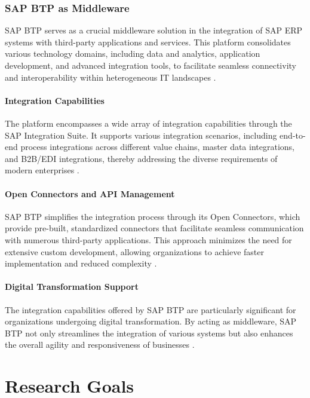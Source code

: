 \subsubsection{SAP BTP as Middleware}

SAP BTP serves as a crucial middleware solution in the integration of SAP ERP systems with third-party applications and services. This platform consolidates various technology domains, including data and analytics, application development, and advanced integration tools, to facilitate seamless connectivity and interoperability within heterogeneous IT landscapes \cite{sap_press, sap_community}.

\paragraph{Integration Capabilities}

The platform encompasses a wide array of integration capabilities through the SAP Integration Suite. It supports various integration scenarios, including end-to-end process integrations across different value chains, master data integrations, and B2B/EDI integrations, thereby addressing the diverse requirements of modern enterprises \cite{sap_learning, sap_community}. 

\paragraph{Open Connectors and API Management}

SAP BTP simplifies the integration process through its Open Connectors, which provide pre-built, standardized connectors that facilitate seamless communication with numerous third-party applications. This approach minimizes the need for extensive custom development, allowing organizations to achieve faster implementation and reduced complexity \cite{sap_community}. 

\paragraph{Digital Transformation Support}

The integration capabilities offered by SAP BTP are particularly significant for organizations undergoing digital transformation. By acting as middleware, SAP BTP not only streamlines the integration of various systems but also enhances the overall agility and responsiveness of businesses \cite{sap_press, sap_learning}.


\section{Research Goals}

